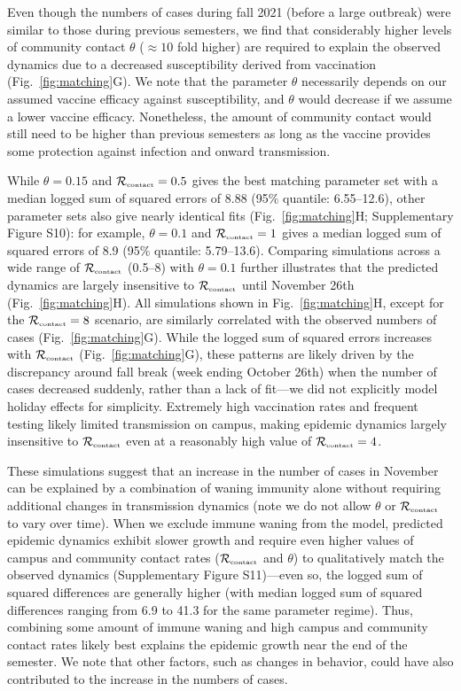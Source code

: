\documentclass[12pt]{article}
\newcommand{\fref}[1]{Fig.~\ref{fig:#1}}
\newcommand{\Rx}[1]{\ensuremath{{\mathcal R}_{#1}}}
\newcommand{\Rc}{\Rx{\textrm{\tiny{contact}}}}
\begin{document}
Even though the numbers of cases during fall 2021 (before a large outbreak) were similar to those during previous semesters, we find that considerably higher levels of community contact $\theta$ ($\approx 10$ fold higher) are required to explain the observed dynamics due to a decreased susceptibility derived from vaccination (\fref{matching}G).
We note that the parameter $\theta$ necessarily depends on our assumed vaccine efficacy against susceptibility, and $\theta$ would decrease if we assume a lower vaccine efficacy.
Nonetheless, the amount of community contact would still need to be higher than previous semesters as long as the vaccine provides some protection against infection and onward transmission.

While $\theta = 0.15$ and $\Rc = 0.5$ gives the best matching parameter set with a median logged sum of squared errors of 8.88 (95\% quantile: 6.55--12.6), other parameter sets also give nearly identical fits (\fref{matching}H; Supplementary Figure S10):
for example, $\theta = 0.1$ and $\Rc = 1$ gives a median logged sum of squared errors of 8.9 (95\% quantile: 5.79--13.6).
Comparing simulations across a wide range of $\Rc$ (0.5--8) with $\theta = 0.1$ further illustrates that the predicted dynamics are largely insensitive to $\Rc$ until November 26th (\fref{matching}H).
All simulations shown in \fref{matching}H, except for the $\Rc=8$ scenario, are similarly correlated with the observed numbers of cases (\fref{matching}G). 
While the logged sum of squared errors increases with $\Rc$ (\fref{matching}G), these patterns are likely driven by the discrepancy around fall break (week ending October 26th) when the number of cases decreased suddenly, rather than a lack of fit---we did not explicitly model holiday effects for simplicity.
Extremely high vaccination rates and frequent testing likely limited transmission on campus, making epidemic dynamics largely insensitive to $\Rc$ even at a reasonably high value of $\Rc = 4$.

These simulations suggest that an increase in the number of cases in November can be explained by a combination of waning immunity alone without requiring additional changes in transmission dynamics (note we do not allow $\theta$ or $\Rc$ to vary over time).
When we exclude immune waning from the model, predicted epidemic dynamics exhibit slower growth and require even higher values of campus and community contact rates ($\Rc$ and $\theta$) to qualitatively match the observed dynamics (Supplementary Figure S11)---even so, the logged sum of squared differences are generally higher (with median logged sum of squared differences ranging from 6.9 to 41.3 for the same parameter regime).
Thus, combining some amount of immune waning and high campus and community contact rates likely best explains the epidemic growth near the end of the semester.
We note that other factors, such as changes in behavior, could have also contributed to the increase in the numbers of cases.
\end{document}
